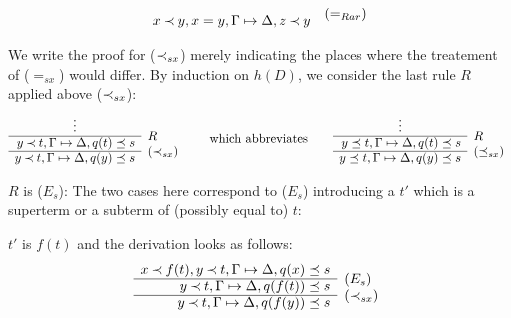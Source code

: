 \begin{PROOF}
\begin{LS}
\[\begin{array}{rl}
x\Incl y,x=y,\GSD,z\Incl y & \rabove{(=_{Rar})}
\end{array}
\]
\end{LS}

We write the proof for ($\mathbin{\prec}_{sx}$) merely indicating the places where the
treatement of ($=_{sx}$) would differ.
By induction on $h(D)$, we consider the last rule $R$ applied above
($\mathbin{\prec}_{sx}$):
\[ \begin{array}{rl}
\multicolumn{1}{c}{\vdots} \\ \cline{1-1}
y\Incl t, \GSD, q(t)\preceq s & \rabove{R}\\ \cline{1-1}
y\Incl t, \GSD, q(y)\preceq s & \rabove{(\Incl_{sx})}
\end{array} 
\hspace*{2em}{\rm which\ abbreviates}\hspace*{2em}
 \begin{array}{rl}
\multicolumn{1}{c}{\vdots} \\ \cline{1-1}
y\preceq t, \GSD, q(t)\preceq s & \rabove{R}\\ \cline{1-1}
y\preceq t, \GSD, q(y)\preceq s & \rabove{(\preceq_{sx})}
\end{array} 
\]
\begin{LS}
\item $R$ is ($E_s$):
The two cases here correspond to ($E_s$) introducing a $t'$ which is a superterm or a
subterm of (possibly equal to) $t$:
 \begin{LSA}
 \item $t'$ is $f(t)$ and the derivation looks as follows:
\[ \begin{array}{rl}
  x\Incl f(t), y\Incl t, \GSD, q(x)\preceq s \\ \cline{1-1}
               y\Incl t, \GSD, q(f(t))\preceq s & \rabove{(E_s)} \\ \cline{1-1}
               y\Incl t, \GSD, q(f(y))\preceq s & \rabove{(\Incl_{sx})} 
\end{array}
\]
\end{LSA}
\end{LS}
\end{PROOF}
